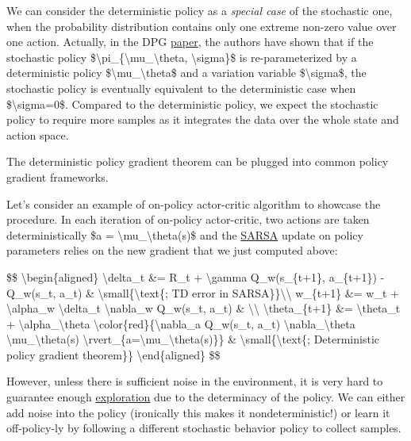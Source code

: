 We can consider the deterministic policy as a \emph{special case} of the stochastic one, when the probability distribution contains only one extreme non-zero value over one action. Actually, in the DPG \href{https://hal.inria.fr/file/index/docid/938992/filename/dpg-icml2014.pdf}{paper}, the authors have shown that if the stochastic policy \$\textbackslash pi\_\{\textbackslash mu\_\textbackslash theta, \textbackslash sigma\}\$ is re-parameterized by a deterministic policy \$\textbackslash mu\_\textbackslash theta\$ and a variation variable \$\textbackslash sigma\$, the stochastic policy is eventually equivalent to the deterministic case when \$\textbackslash sigma=0\$. Compared to the deterministic policy, we expect the stochastic policy to require more samples as it integrates the data over the whole state and action space.

The deterministic policy gradient theorem can be plugged into common policy gradient frameworks.

Let's consider an example of on-policy actor-critic algorithm to showcase the procedure. In each iteration of on-policy actor-critic, two actions are taken deterministically \$a = \textbackslash mu\_\textbackslash theta(s)\$ and the \href{https://lilianweng.github.io/posts/2018-02-19-rl-overview/\#sarsa-on-policy-td-control}{SARSA} update on policy parameters relies on the new gradient that we just computed above:

\$\$ \textbackslash begin\{aligned\} \textbackslash delta\_t \&= R\_t + \textbackslash gamma Q\_w(s\_\{t+1\}, a\_\{t+1\}) - Q\_w(s\_t, a\_t) \& \textbackslash small\{\textbackslash text\{; TD error in SARSA\}\}\textbackslash\textbackslash{} w\_\{t+1\} \&= w\_t + \textbackslash alpha\_w \textbackslash delta\_t \textbackslash nabla\_w Q\_w(s\_t, a\_t) \& \textbackslash\textbackslash{} \textbackslash theta\_\{t+1\} \&= \textbackslash theta\_t + \textbackslash alpha\_\textbackslash theta \textbackslash color\{red\}\{\textbackslash nabla\_a Q\_w(s\_t, a\_t) \textbackslash nabla\_\textbackslash theta \textbackslash mu\_\textbackslash theta(s) \textbackslash rvert\_\{a=\textbackslash mu\_\textbackslash theta(s)\}\} \& \textbackslash small\{\textbackslash text\{; Deterministic policy gradient theorem\}\} \textbackslash end\{aligned\} \$\$

However, unless there is sufficient noise in the environment, it is very hard to guarantee enough \href{https://lilianweng.github.io/posts/2018-02-19-rl-overview/\#exploration-exploitation-dilemma}{exploration} due to the determinacy of the policy. We can either add noise into the policy (ironically this makes it nondeterministic!) or learn it off-policy-ly by following a different stochastic behavior policy to collect samples.

